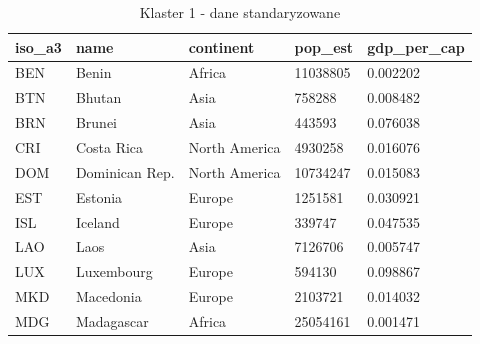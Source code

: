 \documentclass[11pt]{report}
\begin{document}
    \begin{table}[h!]
        \caption {Klaster 1 - dane standaryzowane} \label{tab:cl1std}
        \begin{tabular}{lllll}
            \hline
            \multicolumn{1}{|l|}{iso\_a3} & \multicolumn{1}{l|}{name} & \multicolumn{1}{l|}{continent} & \multicolumn{1}{l|}{pop\_est} & \multicolumn{1}{l|}{gdp\_per\_cap} \\ \hline
            BEN                           & Benin                     & Africa                         & 11038805                      & 0.002202                           \\
            BTN                           & Bhutan                    & Asia                           & 758288                        & 0.008482                           \\
            BRN                           & Brunei                    & Asia                           & 443593                        & 0.076038                           \\
            CRI                           & Costa Rica                & North America                  & 4930258                       & 0.016076                           \\
            DOM                           & Dominican Rep.            & North America                  & 10734247                      & 0.015083                           \\
            EST                           & Estonia                   & Europe                         & 1251581                       & 0.030921                           \\
            ISL                           & Iceland                   & Europe                         & 339747                        & 0.047535                           \\
            LAO                           & Laos                      & Asia                           & 7126706                       & 0.005747                           \\
            LUX                           & Luxembourg                & Europe                         & 594130                        & 0.098867                           \\
            MKD                           & Macedonia                 & Europe                         & 2103721                       & 0.014032                           \\
            MDG                           & Madagascar                & Africa                         & 25054161                      & 0.001471                           \\

\end{tabular}
\end{table}
\end{document}
